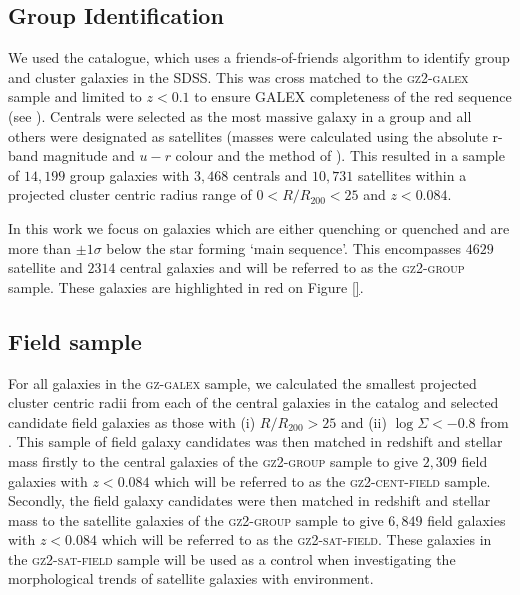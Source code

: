 \documentclass[useAMS,usenatbib]{mn2e}
\begin{document}
\subsection{Group Identification}\label{sec:groups}



We used the \citet{berlind06} catalogue, which uses a friends-of-friends algorithm to identify group and cluster galaxies in the SDSS. This was cross matched to the \textsc{gz2-galex} sample and limited to $z < 0.1$ to ensure GALEX completeness of the red sequence (see \citealt{wyder07, yesuf14}). Centrals were selected as the most massive galaxy in a group and all others were designated as satellites (masses were calculated using the absolute r-band magnitude and $u-r$ colour and the method of \citealt{baldry06}). This resulted in a sample of $14,199$ group galaxies with $3,468$ centrals and $10,731$ satellites within a projected cluster centric radius range of $0 < R/R_{200} < 25$ and $z < 0.084$. 

In this work we focus on galaxies which are either quenching or quenched and are more than $\pm1\sigma$ below the star forming `main sequence'. This encompasses $4629$ satellite and $2314$ central galaxies and will be referred to as the \textsc{gz2-group} sample. These galaxies are highlighted in red on Figure \ref{}. 

\subsection{Field sample}\label{sec:field}

For all galaxies in the \textsc{gz-galex} sample, we calculated the smallest projected cluster centric radii from each of the central galaxies in the  \citet{berlind06} catalog and selected candidate field galaxies as those with (i) $R/R_{200} > 25$ and (ii) $\log\Sigma < -0.8$ from \cite{baldry06}. This sample of field galaxy candidates was then matched in redshift and stellar mass firstly to the central galaxies of the \textsc{gz2-group} sample to give $2,309$ field galaxies with $z < 0.084$ which will be referred to as the \textsc{gz2-cent-field} sample. Secondly, the field galaxy candidates were then matched in redshift and stellar mass to the satellite galaxies of the \textsc{gz2-group} sample to give $6,849$ field galaxies with $z < 0.084$ which will be referred to as the \textsc{gz2-sat-field}. These galaxies in the \textsc{gz2-sat-field} sample will be used as a control when investigating the morphological trends of satellite galaxies with environment. 
\end{document}
